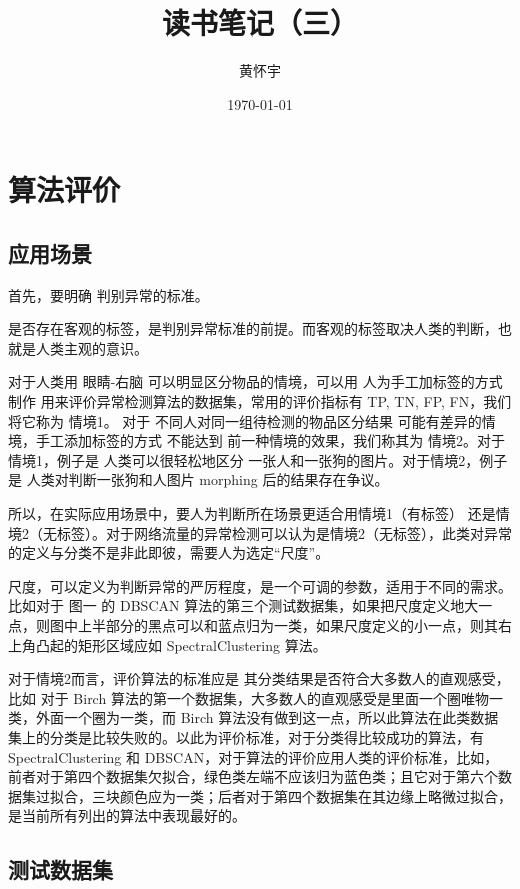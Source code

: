 \documentclass[UTF8]{ctexart}
\title{读书笔记（三）}
\author{黄怀宇}
\date{\today}
\begin{document}
\maketitle

\section{算法评价}
\subsection{应用场景}
首先，要明确 判别异常的标准。

是否存在客观的标签，是判别异常标准的前提。而客观的标签取决人类的判断，也就是人类主观的意识。

对于人类用 眼睛-右脑 可以明显区分物品的情境，可以用 人为手工加标签的方式 制作 用来评价异常检测算法的数据集，常用的评价指标有 TP, TN, FP, FN，我们将它称为 情境1。 对于 不同人对同一组待检测的物品区分结果 可能有差异的情境，手工添加标签的方式 不能达到 前一种情境的效果，我们称其为 情境2。对于情境1，例子是 人类可以很轻松地区分 一张人和一张狗的图片。对于情境2，例子是 人类对判断一张狗和人图片 morphing 后的结果存在争议。

所以，在实际应用场景中，要人为判断所在场景更适合用情境1（有标签） 还是情境2（无标签）。对于网络流量的异常检测可以认为是情境2（无标签），此类对异常的定义与分类不是非此即彼，需要人为选定“尺度”。

尺度，可以定义为判断异常的严厉程度，是一个可调的参数，适用于不同的需求。比如对于 图一 的 DBSCAN 算法的第三个测试数据集，如果把尺度定义地大一点，则图中上半部分的黑点可以和蓝点归为一类，如果尺度定义的小一点，则其右上角凸起的矩形区域应如 SpectralClustering 算法。

对于情境2而言，评价算法的标准应是 其分类结果是否符合大多数人的直观感受，比如 对于 Birch 算法的第一个数据集，大多数人的直观感受是里面一个圈唯物一类，外面一个圈为一类，而 Birch 算法没有做到这一点，所以此算法在此类数据集上的分类是比较失败的。以此为评价标准，对于分类得比较成功的算法，有SpectralClustering 和 DBSCAN，对于算法的评价应用人类的评价标准，比如，前者对于第四个数据集欠拟合，绿色类左端不应该归为蓝色类；且它对于第六个数据集过拟合，三块颜色应为一类；后者对于第四个数据集在其边缘上略微过拟合，是当前所有列出的算法中表现最好的。

\subsection{测试数据集}
\end{document}
